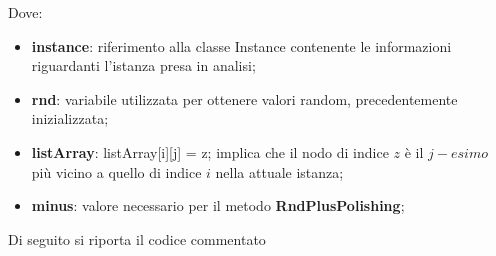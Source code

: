 \documentclass[11pt]{article}
\begin{document}
Dove:

\begin{itemize}
    \item \textbf{instance}: riferimento alla classe Instance contenente le informazioni riguardanti l'istanza presa in analisi;
    \item \textbf{rnd}: variabile utilizzata per ottenere valori random, precedentemente inizializzata;
    \item \textbf{listArray}: listArray[i][j] = z; implica che il nodo di indice $z$ è il $j-esimo$ più vicino a quello di indice $i$ nella attuale istanza;
    \item \textbf{minus}: valore necessario per il metodo \textbf{RndPlusPolishing};
\end{itemize}

Di seguito si riporta il codice commentato
\end{document}

